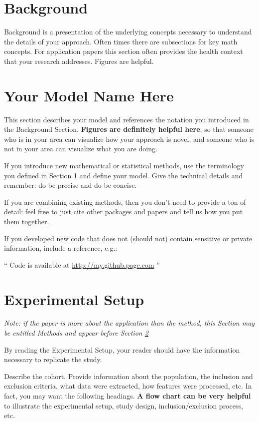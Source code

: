 \documentclass[twoside,11pt]{article}
\begin{document}
\section{Background} \label{background}
Background is a presentation of the underlying concepts necessary to understand the details of your approach. Often times there are subsections for key math concepts. For application papers this section often provides the health context that your research addresses. Figures are helpful.

\section{Your Model Name Here} \label{model}
This section describes your model and references the notation you introduced in the Background Section. \textbf{Figures are definitely helpful here}, so that someone who is in your area can visualize how your approach is novel, and someone who is not in your area can visualize what you are doing.

If you introduce new mathematical or statistical methods, use the terminology you defined in Section \ref{background} and define your model. Give the technical details and remember: do be precise and do be concise.

If you are combining existing methods, then you don't need to provide a ton of detail: feel free to just cite other packages and papers and tell us how you put them together.  

If you developed new code that does not (should not) contain sensitive or private information, include a reference, e.g.:

`` Code is available at \url{http://my.github.page.com} ''

\section{Experimental Setup} \label{experiment}
\emph{Note: if the paper is more about the application than the method, this Section may be entitled Methods and appear before Section \ref{model}}

By reading the Experimental Setup, your reader should have the information necessary to replicate the study.

Describe the cohort. Provide information about the population, the inclusion and exclusion criteria, what data were extracted, how features were processed, etc. In fact, you may want the following headings. \textbf{A flow chart can be very helpful} to illustrate the experimental setup, study design, inclusion/exclusion process, etc.
\end{document}
